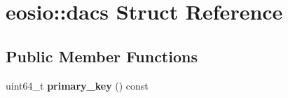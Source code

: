 \hypertarget{structeosio_1_1dacs}{}\section{eosio\+:\+:dacs Struct Reference}
\label{structeosio_1_1dacs}
\subsection*{Public Member Functions}
\begin{DoxyCompactItemize}
\item 
\mbox{\label{structeosio_1_1dacs_a0d9d72f11eda491944aaac9015903746}} 
uint64\+\_\+t {\bfseries primary\+\_\+key} () const
\end{DoxyCompactItemize}
